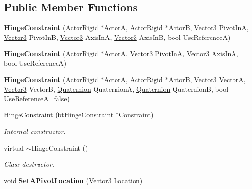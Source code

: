 \subsection*{Public Member Functions}
\begin{DoxyCompactItemize}
\item 
\hypertarget{classphys_1_1HingeConstraint_a0ee9255d9d3af90cf611195852299367}{
{\bfseries HingeConstraint} (\hyperlink{classphys_1_1ActorRigid}{ActorRigid} $\ast$ActorA, \hyperlink{classphys_1_1ActorRigid}{ActorRigid} $\ast$ActorB, \hyperlink{classphys_1_1Vector3}{Vector3} PivotInA, \hyperlink{classphys_1_1Vector3}{Vector3} PivotInB, \hyperlink{classphys_1_1Vector3}{Vector3} AxisInA, \hyperlink{classphys_1_1Vector3}{Vector3} AxisInB, bool UseReferenceA)}
\label{d3/d0d/classphys_1_1HingeConstraint_a0ee9255d9d3af90cf611195852299367}

\item 
\hypertarget{classphys_1_1HingeConstraint_ad3fbe05bb3ab370d20935f9467b81dd3}{
{\bfseries HingeConstraint} (\hyperlink{classphys_1_1ActorRigid}{ActorRigid} $\ast$ActorA, \hyperlink{classphys_1_1Vector3}{Vector3} PivotInA, \hyperlink{classphys_1_1Vector3}{Vector3} AxisInA, bool UseReferenceA)}
\label{d3/d0d/classphys_1_1HingeConstraint_ad3fbe05bb3ab370d20935f9467b81dd3}

\item 
\hypertarget{classphys_1_1HingeConstraint_acf99af18e95c5b42119d91aff8a02a2a}{
{\bfseries HingeConstraint} (\hyperlink{classphys_1_1ActorRigid}{ActorRigid} $\ast$ActorA, \hyperlink{classphys_1_1ActorRigid}{ActorRigid} $\ast$ActorB, \hyperlink{classphys_1_1Vector3}{Vector3} VectorA, \hyperlink{classphys_1_1Vector3}{Vector3} VectorB, \hyperlink{classphys_1_1Quaternion}{Quaternion} QuaternionA, \hyperlink{classphys_1_1Quaternion}{Quaternion} QuaternionB, bool UseReferenceA=false)}
\label{d3/d0d/classphys_1_1HingeConstraint_acf99af18e95c5b42119d91aff8a02a2a}

\item 
\hyperlink{classphys_1_1HingeConstraint_ab326e7128413aa3b737b726b3513c8df}{HingeConstraint} (btHingeConstraint $\ast$Constraint)
\begin{DoxyCompactList}\small\item\em Internal constructor. \item\end{DoxyCompactList}\item 
virtual \hyperlink{classphys_1_1HingeConstraint_af97da06f82fa1903bb20393760f4ae34}{$\sim$HingeConstraint} ()
\begin{DoxyCompactList}\small\item\em Class destructor. \item\end{DoxyCompactList}\item 
\hypertarget{classphys_1_1HingeConstraint_afa922bdd01eaa8e8c1bbafff1c5f7500}{
void {\bfseries SetAPivotLocation} (\hyperlink{classphys_1_1Vector3}{Vector3} Location)}
\label{d3/d0d/classphys_1_1HingeConstraint_afa922bdd01eaa8e8c1bbafff1c5f7500}


\end{DoxyCompactItemize}
